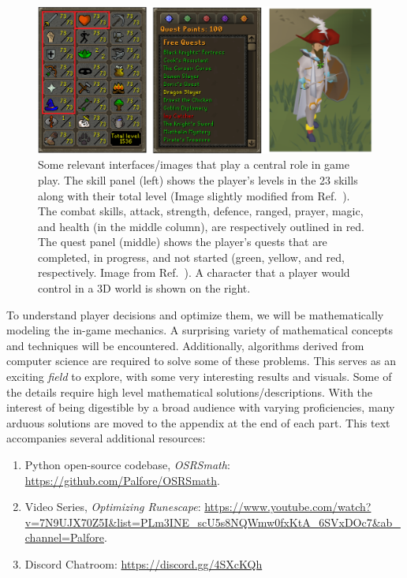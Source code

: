 \begin{figure}[h!]
	\centering
	\includegraphics[width=\linewidth]{img/general/skills_quest_player.png}
	\caption{
		Some relevant interfaces/images that play a central role in game play. The skill panel (left) shows the player's levels in the 23 skills along with their total level (Image slightly modified from Ref.~\cite{wiki:skills}). The combat skills, attack, strength, defence, ranged, prayer, magic, and health (in the middle column), are respectively outlined in red. The quest panel (middle) shows the player's quests that are completed, in progress, and not started (green, yellow, and red, respectively. Image from Ref.~\cite{wiki:quests}). A character that a player would control in a 3D world is shown on the right.
	}
	\label{fig:skills_quest_player}
\end{figure}

\newpage
To understand player decisions and optimize them, we will be mathematically modeling the in-game mechanics. A surprising variety of mathematical concepts and techniques will be encountered. Additionally, algorithms derived from computer science are required to solve some of these problems. This serves as an exciting \textit{field} to explore, with some very interesting results and visuals. Some of the details require high level mathematical solutions/descriptions. With the interest of being digestible by a broad audience with varying proficiencies, many arduous solutions are moved to the appendix at the end of each part.
\vspace{2em}
\newline
This text accompanies several additional resources:
\begin{enumerate}
	\item Python open-source codebase, \textit{OSRSmath}: \url{https://github.com/Palfore/OSRSmath}.
	\item Video Series, \textit{Optimizing Runescape}: \url{https://www.youtube.com/watch?v=7N9UJX70Z5I&list=PLm3INE_scU5s8NQWmw0fxKtA_6SVxDOc7&ab_channel=Palfore}.
	\item Discord Chatroom: \url{https://discord.gg/4SXcKQh}
\end{enumerate}
